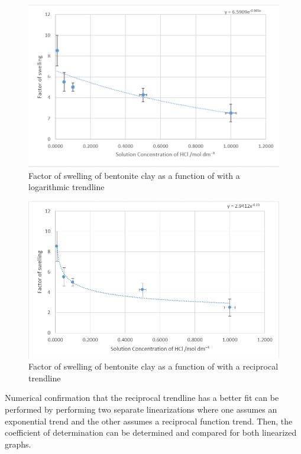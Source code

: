 \documentclass[11pt, letterpaper]{article}
\begin{document}
\begin{multicols}{2}
    \begin{figure}[H]
        \centering
        \includegraphics[width=\linewidth]{exponential.png}
        \caption{Factor of swelling of bentonite clay as a function of \ce{[HCl]} with a logarithmic trendline}
        \label{fig:exponential}
    \end{figure}
    \begin{figure}[H]
        \centering
        \includegraphics[width=\linewidth]{reciprocal.png}
        \caption{Factor of swelling of bentonite clay as a function of \ce{[HCl]} with a reciprocal trendline}
        \label{fig:reciprocal}
    \end{figure}
\end{multicols}

Numerical confirmation that the reciprocal trendline has a better fit can be performed
by performing two separate linearizations where one assumes
an exponential trend and the other assumes a reciprocal function
trend. Then, the coefficient of determination can be determined
and compared for both linearized graphs.
\end{document}
